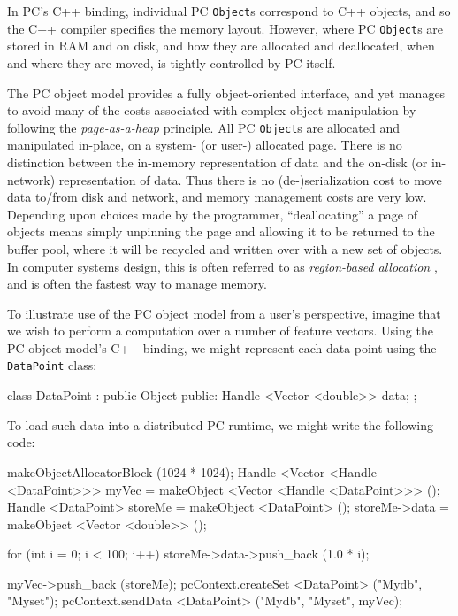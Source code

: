 In PC's C++ binding, individual PC \texttt{Object}s correspond to C++ objects, and so the C++ compiler specifies the memory layout.
However, where PC \texttt{Object}s are stored in RAM and on disk, and how they are allocated and deallocated, when and where they are moved, is
tightly controlled by PC itself.

The PC object model provides a fully object-oriented interface, and yet manages to avoid many of the costs associated with complex object manipulation
by following the \emph{page-as-a-heap} principle.  
All PC \texttt{Object}s are allocated and manipulated in-place, on a system-
(or user-) allocated page.  There is
no distinction between the in-memory representation of data and the on-disk (or in-network) representation of
data. Thus there is no (de-)serialization cost to move data to/from disk and network, and memory management costs are very low. Depending upon choices made by the
programmer, ``deallocating'' a page of objects
means simply unpinning the page and allowing it to be returned to the buffer
pool, where it will be recycled and written over with a new set of objects.  
In computer systems design, this is often referred to as
\emph{region-based allocation} \cite{tofte1997region,
  grossman2002region}, and is often the fastest way to manage
memory. 

To illustrate use of the PC object model from a user's perspective,
imagine that we wish to perform a computation over a number of feature vectors.  
Using the PC object model's C++ binding, we might represent each data point using the 
\texttt{DataPoint} class:

\begin{codesmall}
class DataPoint : public Object {
public:
	Handle <Vector <double>> data;
};
\end{codesmall}

\noindent
To load such data into a distributed PC runtime, we might write the following code:

\begin{codesmall}
makeObjectAllocatorBlock (1024 * 1024);
Handle <Vector <Handle <DataPoint>>> myVec = 
     makeObject <Vector <Handle <DataPoint>>> ();
Handle <DataPoint> storeMe = makeObject <DataPoint> ();
storeMe->data = makeObject <Vector <double>> ();

for (int i = 0; i < 100; i++) 
     storeMe->data->push_back (1.0 * i);

myVec->push_back (storeMe);
pcContext.createSet <DataPoint> ("Mydb", "Myset");
pcContext.sendData <DataPoint> ("Mydb", "Myset", myVec);
\end{codesmall}

